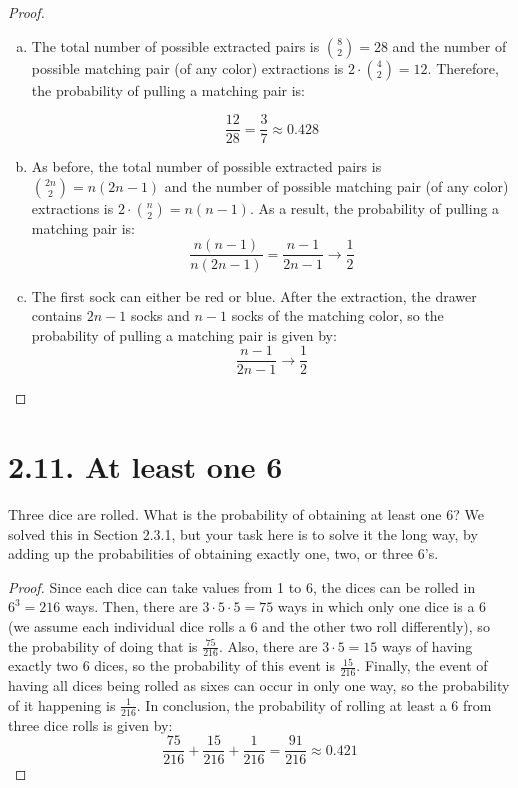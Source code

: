 \vspace{1em}

\begin{proof}
    \hfill
    \begin{enumerate}[(a)]
        \item The total number of possible extracted pairs is $\binom{8}{2} = 28$ and the number
            of possible matching pair (of any color) extractions is $2 \cdot \binom{4}{2} = 12$. 
            Therefore, the probability of pulling a matching pair is:
            
            \[
                \frac{12}{28} = \frac{3}{7} \approx 0.428
            \] 

        \item As before, the total number of possible extracted pairs is $\binom{2n}{2} = n(2n - 1)$ and
            the number of possible matching pair (of any color) extractions is 
            $2 \cdot \binom{n}{2} = n(n - 1)$. As a result, the probability of pulling a 
            matching pair is:
            \[
                \frac{n(n-1)}{n(2n - 1)} = \frac{n - 1}{2n - 1} \to \frac{1}{2}
            \] 
        \item The first sock can either be red or blue. After the extraction, the drawer contains
            $2n - 1$ socks and $n - 1$ socks of the matching color, so the probability of pulling
            a matching pair is given by:
            \[
                \frac{n - 1}{2n - 1} \to \frac{1}{2}
            \] 
    \end{enumerate}
\end{proof}

\section*{2.11. At least one 6}
Three dice are rolled. What is the probability of obtaining at least one 6? We solved
this in Section 2.3.1, but your task here is to solve it the long way, by adding up the
probabilities of obtaining exactly one, two, or three 6's.

\begin{proof}
    Since each dice can take values from 1 to 6, the dices can be rolled in $6^3 = 216$ ways. 
    Then, there are $3 \cdot 5 \cdot 5 = 75$ ways in which only one dice is a 6 (we assume
    each individual dice rolls a 6 and the other two roll differently), so the probability 
    of doing that is $\frac{75}{216}$. Also, there are $3 \cdot 5 = 15$  
    ways of having exactly two 6 dices, so the probability of this event is $\frac{15}{216}$. 
    Finally, the event of having all dices being rolled as sixes can occur in only one way, so the 
    probability of it happening is $\frac{1}{216}$. In conclusion, the probability of rolling at least a 6 
    from three dice rolls is given by:
    \[
        \frac{75}{216} + \frac{15}{216} + \frac{1}{216} = \frac{91}{216} \approx 0.421
    \] 
\end{proof}

